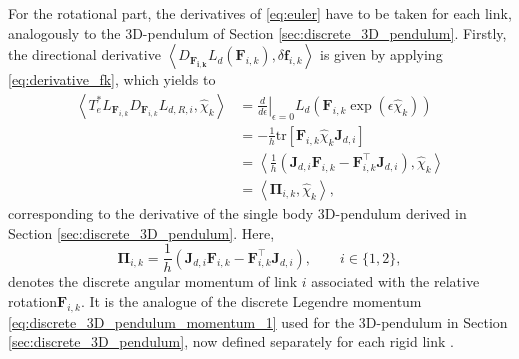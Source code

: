 For the rotational part, the derivatives of \ref{eq:euler} have to be taken for each link, analogously to the 3D-pendulum of Section \ref{sec:discrete_3D_pendulum}.
Firstly, the directional derivative $\left\langle D_{\bm{F_{i,k}}}L_d(\bm{F}_{i,k}), \delta \bm{f}_{i,k} \right\rangle$ is given by applying \eqref{eq:derivative_fk}, which yields to
\begin{equation}
    \begin{aligned}
    \left\langle
    T_e^*L_{\bm{F}_{i,k}}
    D_{\bm{F}_{i,k}}L_{d,R,i},
    \hat{\chi}_k
    \right\rangle
    &=
    \left.
    \frac{d}{d\epsilon}
    \right|_{\epsilon=0}
    L_{d}
    \left(
    \bm{F}_{i,k}
    \exp(\epsilon\hat{\chi}_k)
    \right)
    \\
    &=
    -
    \frac{1}{h}
    \mathrm{tr}
    \left[
    \bm{F}_{i,k}
    \hat{\chi}_k
    \bm{J}_{d,i}
    \right]
    \\
    &=
    \left\langle
    \frac{1}{h}
    \left(
    \bm{J}_{d,i}\bm{F}_{i,k}
    -
    \bm{F}_{i,k}^{\top}\bm{J}_{d,i}
    \right),
    \hat{\chi}_k
    \right\rangle
    \\
    &=
    \left\langle
    \bm{\Pi}_{i,k}
    ,
    \hat{\chi}_k
    \right\rangle
    , 
    \end{aligned}
    \label{eq:acrobot_rotational_derivative_pairing}
\end{equation}
corresponding to the derivative of the single body 3D-pendulum derived in Section \ref{sec:discrete_3D_pendulum}. 
Here,
\begin{equation}
    \bm{\Pi}_{i,k}
    =
    \frac{1}{h}
    \left(
        \bm{J}_{d,i}\bm{F}_{i,k}
        -
        \bm{F}_{i,k}^{\top}\bm{J}_{d,i}
    \right),
    \qquad i\in\{1,2\},
    \label{eq:acrobot_discrete_angular_momentum}
\end{equation}
denotes the discrete angular momentum
of link \(i\) associated with the relative rotation\(\bm{F}_{i,k}\).
It is the analogue of the discrete Legendre momentum \eqref{eq:discrete_3D_pendulum_momentum_1} used for
the 3D-pendulum in Section \ref{sec:discrete_3D_pendulum}, now defined separately for each rigid link \cite{Lee2008}.

